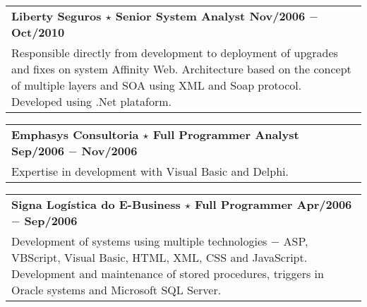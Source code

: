 \documentclass[a4paper, oneside, final]{scrartcl}
\newcommand{\vspc}{\vspace{0.15cm}} %
\begin{document}
\begin{center}
\begin{tabularx}{1\linewidth}{X}
{\bf Liberty Seguros $\star$ Senior System Analyst \hfill Nov/2006 $-$ Oct/2010} \\
Responsible directly from development to deployment of upgrades and fixes on system Affinity Web. Architecture based on the concept of multiple layers and SOA using XML and Soap protocol. Developed using .Net plataform.\vspc\\
\end{tabularx}

\begin{tabularx}{1\linewidth}{X}
{\bf Emphasys Consultoria $\star$ Full Programmer Analyst \hfill Sep/2006 $-$ Nov/2006} \\
Expertise in development with Visual Basic and Delphi. \vspc\\
\end{tabularx}

\begin{tabularx}{1\linewidth}{X}
{\bf Signa Logística do E-Business $\star$ Full Programmer \hfill Apr/2006 $-$ Sep/2006} \\
Development of systems using multiple technologies $-$ ASP, VBScript, Visual Basic, HTML, XML, CSS and JavaScript. Development and maintenance of stored procedures, triggers in Oracle systems and Microsoft SQL Server. \vspc\\
\end{tabularx}




\end{center}
\end{document}
